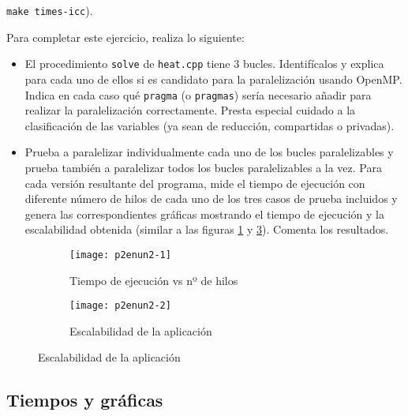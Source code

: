 \begin{ejer}
     \texttt{make times-icc}).
    \par Para completar este ejercicio, realiza lo siguiente:
    \begin{itemize}
        \item El procedimiento \texttt{solve} de \texttt{heat.cpp} tiene 3 bucles. Identifícalos y explica para cada uno
        de ellos si es candidato para la paralelización usando OpenMP. Indica en cada caso qué
        \texttt{pragma} (o \texttt{pragmas}) sería necesario añadir para realizar la paralelización correctamente.
        Presta especial cuidado a la clasificación de las variables (ya sean de reducción, compartidas
        o privadas).
        \item Prueba a paralelizar individualmente cada uno de los bucles paralelizables y prueba también a
        paralelizar todos los bucles paralelizables a la vez. Para cada versión resultante del programa,
        mide el tiempo de ejecución con diferente número de hilos de cada uno de los tres casos de
        prueba incluidos y genera las correspondientes gráficas mostrando el tiempo de ejecución y
        la escalabilidad obtenida (similar a las figuras \ref{fig:p2enun2-1} y \ref{fig:p2enun2-2}). Comenta los resultados.
    \end{itemize}
\end{ejer}
\begin{figure}
    \centering
    \begin{subfigure}{0.4\textwidth}
        \texttt{[image: p2enun2-1]}
        \caption{Tiempo de ejecución vs nº de hilos}
        \label{fig:p2enun2-1}
    \end{subfigure}
    \begin{subfigure}{0.4\textwidth}
        \texttt{[image: p2enun2-2]}
        \caption{Escalabilidad de la aplicación}
        \label{fig:p2enun2-2}
    \end{subfigure}
\end{figure}

\subsection{Tiempos y gráficas}







